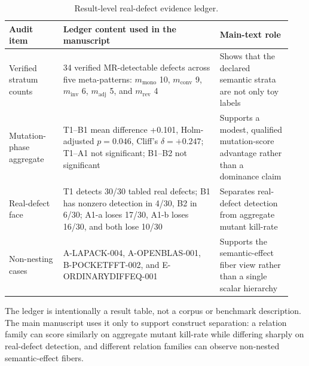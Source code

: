 \documentclass[manuscript,screen,review]{acmart}
\begin{document}
{%
\small
\begin{longtable}[]{@{}p{0.18\linewidth}p{0.52\linewidth}p{0.24\linewidth}@{}}
\caption{Result-level real-defect evidence ledger.}\label{tab:realdefect-ledger}\\
\toprule\noalign{}
Audit item & Ledger content used in the manuscript & Main-text role \\
\midrule\noalign{}
\endfirsthead
\endhead
\bottomrule\noalign{}
\endlastfoot
Verified stratum counts & 34 verified MR-detectable defects across five
meta-patterns: \(m_{\mathrm{mono}}\) 10, \(m_{\mathrm{conv}}\) 9,
\(m_{\mathrm{inv}}\) 6, \(m_{\mathrm{adj}}\) 5, and
\(m_{\mathrm{rev}}\) 4 & Shows that the declared semantic strata are not
only toy labels \\
Mutation-phase aggregate & T1--B1 mean difference +0.101,
Holm-adjusted \(p = 0.046\), Cliff's \(\delta = +0.247\); T1--A1 not
significant; B1--B2 not significant & Supports a modest, qualified
mutation-score advantage rather than a dominance claim \\
Real-defect face & T1 detects 30/30 tabled real defects; B1 has nonzero
detection in 4/30, B2 in 6/30; A1-a loses 17/30, A1-b loses 16/30, and
both lose 10/30 & Separates real-defect detection from aggregate mutant
kill-rate \\
Non-nesting cases & A-LAPACK-004, A-OPENBLAS-001, B-POCKETFFT-002, and
E-ORDINARYDIFFEQ-001 & Supports the semantic-effect fiber view rather
than a single scalar hierarchy \\
\end{longtable}
\normalsize
}

The ledger is intentionally a result table, not a corpus or benchmark
description. The main manuscript uses it only to support construct
separation: a relation family can score similarly on aggregate mutant
kill-rate while differing sharply on real-defect detection, and different
relation families can observe non-nested semantic-effect fibers.



\end{document}
